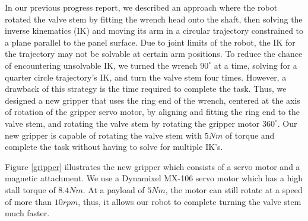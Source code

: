 \documentclass{standalone}
\begin{document}
In our previous progress report, we described an approach where the robot rotated the valve stem by fitting the wrench head onto the shaft, then solving the inverse kinematics (IK) and moving its arm in a circular trajectory constrained to a plane parallel to the panel surface.
Due to joint limits of the robot, the IK for the trajectory may
not be solvable at certain arm positions. To reduce the chance of encountering unsolvable IK, we turned the wrench $90^{\circ}$ at a time, solving for a quarter circle trajectory's IK, and turn the valve stem four times. However, a drawback of this strategy is the time required to
complete the task. Thus, we designed a new gripper that uses the ring
end of the wrench, centered at the axis of rotation of the gripper servo
motor, by aligning and fitting the ring end to the valve
stem, and rotating the valve stem by rotating the gripper motor
$360^{\circ}$. Our new gripper is capable of rotating the valve 
stem with $5Nm$ of torque and complete the task without having
to solve for multiple IK's.



Figure \ref{gripper} illustrates the new gripper which consists of a
servo motor and a magnetic attachment. We use a Dynamixel MX-106
servo motor which has a high stall torque of $8.4Nm$. At a payload of 
$5Nm$, the motor can still rotate at a speed of
more than $10 rpm$, thus, it allows our robot to complete turning 
the valve stem much faster.

\end{document}
